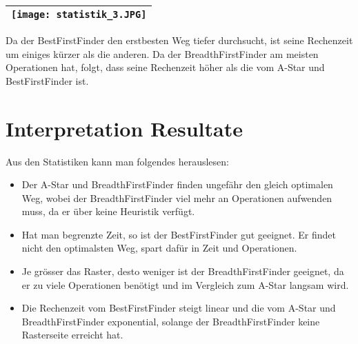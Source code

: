 \begin{longtable}[]{@{}l@{}}
\toprule
\endhead
\texttt{[image: statistik\_3.JPG]}\tabularnewline
\bottomrule
\end{longtable}

Da der BestFirstFinder den erstbesten Weg tiefer durchsucht, ist seine
Rechenzeit um einiges kürzer als die anderen. Da der
BreadthFirstFinder am meisten Operationen hat, folgt, dass
seine Rechenzeit höher als die vom A-Star und BestFirstFinder ist.

\section{Interpretation Resultate}

Aus den Statistiken kann man folgendes herauslesen:

\begin{itemize}
\item
  Der A-Star und BreadthFirstFinder finden ungefähr den gleich optimalen Weg,
  wobei der BreadthFirstFinder viel mehr an Operationen aufwenden muss,
  da er über keine Heuristik verfügt.
\item
  Hat man begrenzte Zeit, so ist der BestFirstFinder gut geeignet. Er
  findet nicht den optimalsten Weg, spart dafür in Zeit und Operationen.
\item
  Je grösser das Raster, desto weniger ist der BreadthFirstFinder
  geeignet, da er zu viele Operationen benötigt und im Vergleich zum A-Star langsam wird.
\item
  Die Rechenzeit vom BestFirstFinder steigt linear und die vom
  A-Star und BreadthFirstFinder exponential, solange der
  BreadthFirstFinder keine Rasterseite erreicht hat.
\end{itemize}


